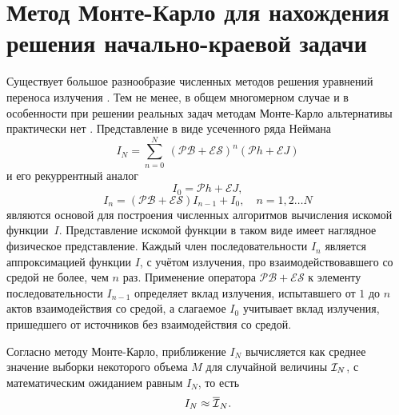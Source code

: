 \documentclass[12pt,reqno]{report}
\begin{document}
\section{Метод  Монте-Карло для нахождения решения начально-краевой задачи}
Существует большое разнообразие численных методов решения
уравнений переноса излучения \cite{1,2,3,4,5,12,13,14,15,16,17,18,19}. Тем не менее, в
общем  многомерном случае и в особенности при решении реальных
задач методам Монте-Карло альтернативы практически нет
\cite{34}. 
Представление в виде усеченного ряда Неймана
\begin{equation}
I_N = \sum_{n=0}^{N}\ (\mathcal{PB} + \mathcal{ES})^n (\mathcal P h
+ \mathcal E J)
\end{equation}
и его рекуррентный аналог
\begin{equation}
I_0 = \mathcal P h + \mathcal E J,
\end{equation}
\begin{equation}
I_n = (\mathcal{PB} + \mathcal{ES}) I_{n-1} + I_0,\quad n = 1, 2 \dots N
\end{equation}
являются основой для построения численных алгоритмов вычисления
искомой функции~$I$. Представление искомой функции в таком виде
имеет наглядное физическое представление. Каждый член
последовательности $I_n$ является аппроксимацией функции $I$, 
с учётом излучения, про взаимодействовавшего со средой не более, чем $n$ раз.
Применение оператора $\mathcal{PB} + \mathcal{ES}$ к   элементу
последовательности $I_{n-1}$ определяет вклад излучения,
испытавшего от $1$  до    $n$  актов взаимодействия со средой, а
слагаемое $I_0$ учитывает вклад излучения, пришедшего от
источников без взаимодействия со средой.

Согласно методу Монте-Карло, приближение $I_N$
вычисляется как среднее значение выборки некоторого объема $M$ для случайной 
величины ${\cal I}_N$, с математическим ожиданием равным $I_N$, то есть
\begin{equation}
I_N \approx \overline{\cal I}_{N}.
\end{equation}
\end{document}
